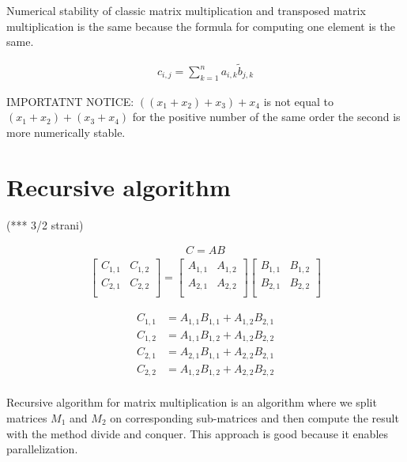 \documentclass[a4paper,11pt]{article}
\begin{document}
Numerical stability of classic matrix multiplication and transposed matrix 
multiplication is the same because the formula for computing one element is the same. 

\begin{align*}
c_{i,j} = \sum_{k=1}^{n} a_{i,k} \widetilde{b}_{j,k}
\end{align*}

IMPORTATNT NOTICE:
$((x_{1}+x_{2})+x_{3})+x_{4}$ is not equal to $(x_{1}+x_{2})+(x_{3}+x_{4})$ 
for the positive number of the same order the second is more numerically stable.



\section{Recursive algorithm}
(*** 3/2 strani)

\begin{align*}
C=AB
\end{align*}
\begin{align*}
\begin{bmatrix}
C_{1,1} & C_{1,2} \\
C_{2,1} & C_{2,2} \\
\end{bmatrix}
=
\begin{bmatrix}
A_{1,1} & A_{1,2} \\
A_{2,1} & A_{2,2} \\
\end{bmatrix}
\begin{bmatrix}
B_{1,1} & B_{1,2} \\
B_{2,1} & B_{2,2} \\
\end{bmatrix}
\end{align*}

\begin{align*}
C_{1,1} &= A_{1,1}B_{1,1} + A_{1,2}B_{2,1} \\
C_{1,2} &= A_{1,1}B_{1,2} + A_{1,2}B_{2,2} \\
C_{2,1} &= A_{2,1}B_{1,1} + A_{2,2}B_{2,1} \\
C_{2,2} &= A_{1,2}B_{1,2} + A_{2,2}B_{2,2} \\
\end{align*}

Recursive algorithm for matrix multiplication 
is an algorithm where we split matrices
$M_{1}$ and $M_{2}$ on corresponding
sub-matrices and then compute the 
result with the method divide and conquer. 
This approach is good because it 
enables parallelization. 
\end{document}
